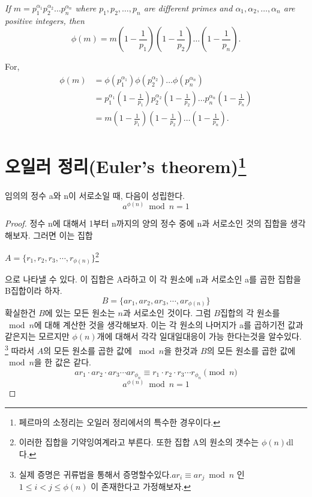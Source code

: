 \emph{If $m = p_1^{\alpha_1} p_2^{\alpha_2} \ldots p_n^{\alpha_n}$
where $p_1, p_2, \ldots, p_n$ are different primes and $\alpha_1,
\alpha_2, \ldots, \alpha_n$ are positive integers, then}
\begin{equation*}
\phi(m) = m \left ( 1-\frac{1}{p_1} \right )
            \left ( 1-\frac{1}{p_2} \right )
            \ldots
            \left ( 1-\frac{1}{p_n} \right ).
\end{equation*}

For,
\begin{align*}
\phi(m) &= \phi(p_1^{\alpha_1}) \phi(p_2^{\alpha_2}) \ldots
             \phi(p_n^{\alpha_n}) \\
        &= p_1^{\alpha_1} \left ( 1-\frac{1}{p_1} \right )
             p_2^{\alpha_2} \left ( 1-\frac{1}{p_2} \right )
             \ldots
             p_n^{\alpha_n} \left ( 1-\frac{1}{p_n} \right ) \\
        &= m \left ( 1-\frac{1}{p_1} \right )
             \left ( 1-\frac{1}{p_2} \right )
             \ldots
             \left ( 1-\frac{1}{p_n} \right ).
\end{align*}



\section{오일러 정리(Euler's theorem)\protect\footnote{페르마의 소정리는 오일러 정리에서의 특수한 경우이다.}}

\begin{justbox}
    \begin{theorem}
        임의의 정수 a와 n이 서로소일 때, 다음이 성립한다.
        \[a^{\phi(n)} \bmod n = 1\]
    \end{theorem}
\end{justbox}

\begin{proof}
    
정수 n에 대해서 1부터 n까지의 양의 정수 중에 n과 서로소인 것의 집합을 생각해보자.
그러면 이는 집합
\begin{center}
    $A = \{ r_1 ,r_2,r_3, \cdots ,r_{\phi(n)}\}$\footnote{이러한 집합을 기약잉여계라고 부른다. 또한 집합 A의 원소의 갯수는 $\phi(n)$dl다.}
\end{center}
으로 나타낼 수 있다. 이 집합은 A라하고 이 각 원소에 n과 서로소인 a를 곱한 집합을 B집합이라 하자.
\[B = \{ ar_1 ,ar_2,ar_3, \cdots ,ar_{\phi(n)}\} \]
확실한건 $B$에 있는 모든 원소는 $n$과 서로소인 것이다. 
그럼 $B$집합의 각 원소를 $\bmod n$에 대해 계산한 것을 생각해보자.
 이는 각 원소의 나머지가 a를 곱하기전 값과 같은지는 모르지만 $\phi(n)$개에 대해서 각각 일대일대응이 가능 한다는것을 알수있다.
  \footnote{실제 증명은 귀류법을 통해서 증명할수있다.$ar_i  \equiv ar_j \bmod n $ 인 $1 \le i < j \le \phi(n)$ 이 존재한다고 가정해보자.}
따라서 $A$의 모든 원소를 곱한 값에 $\bmod n$을 한것과 $B$의 모든 원소를 곱한 값에 $\bmod n$을 한 값은 같다.
\[ar_1 \cdot ar_2 \cdot ar_3 \cdots ar_{\phi_{n}} \equiv r_1 \cdot r_2 \cdot r_3 \cdots r_{\phi_{n}} \pmod n\]
\[a^{\phi(n)}\bmod n= 1\]
\end{proof}


